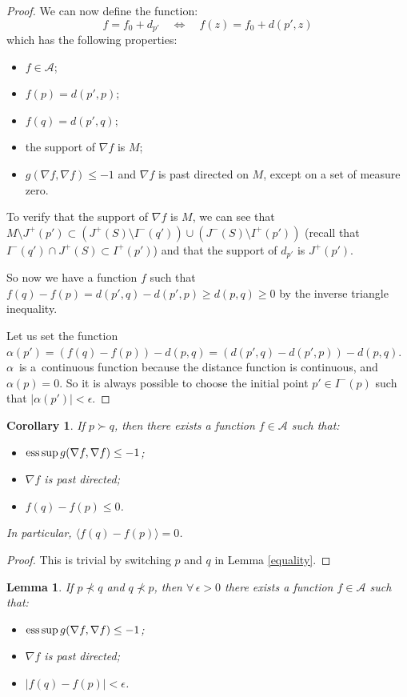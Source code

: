 \documentclass[11pt]{article}
\newtheorem{lemma}{Lemma}
\newtheorem{corollary}{Corollary}
\newcommand{\abs}[1]{\left\vert {#1} \right\vert}
\newcommand{\parenthese}[1]{\left( {#1} \right)}
\newcommand{\Lequi}{\Longleftrightarrow}
\begin{document}
\begin{proof}
We can now def\/ine the function:
\[
f = f_0 + d_{p'}  \quad \Lequi \quad f(z) = f_0 + d(p',z)
\]
which has the following properties:
\begin{itemize}\itemsep=0pt
\item $f\in\mathcal A$;
\item $f(p)= d(p',p)$;
\item $f(q)= d(p',q)$;
\item the support of $\nabla f$ is $M$;
\item $g( \nabla f, \nabla f) \leq -1$ and $\nabla f$ is past directed on $M$, except on a set of measure zero.
\end{itemize}

To verify that the support of $\nabla f$ is $M$, we can see that $M \setminus J^+(p') \subset \parenthese{J^+(S) \setminus I^-(q')} \cup  \parenthese{J^-(S) \setminus I^+(p')} $ (recall that $I^-(q') \cap J^+(S) \subset I^+(p')$) and that the support of $d_{p'}$ is $J^+(p')$.

So now we have a function $f$ such that $f(q)-f(p) = d(p',q) - d(p',p) \geq d(p,q) \geq 0$ by the inverse triangle inequality.

Let us set the function $\alpha(p') = \parenthese{f(q) - f(p)} - d(p,q) = \parenthese{d(p',q) - d(p',p)} - d(p,q)$. $\alpha$~is a~continuous function because the distance function is continuous, and $\alpha(p) = 0$. So it is always possible to choose the initial point $p' \in I^-(p)$ such that $\abs{\alpha(p')} < \epsilon$.
\end{proof}

\begin{corollary}\label{equalityrev}
If $p \succ q$, then there exists a function $f\in \mathcal A$ such that:
\begin{itemize}\itemsep=0pt
\item $\text{\rm ess} \sup g( \nabla f, \nabla f ) \leq -1$;
\item $\nabla f$ is past directed;
\item $f(q)-f(p) \leq 0$.
\end{itemize}
In particular, $\langle f(q)-f(p) \rangle = 0$.

\end{corollary}

\begin{proof}
This is trivial by switching $p$ and $q$ in Lemma \ref{equality}.
\end{proof}

\begin{lemma}\label{zero}
If $p \nprec q$ and $q \nprec p$, then $\forall \, \epsilon > 0$ there exists a function $f\in \mathcal A$ such that:
\begin{itemize}
\item $\text{\rm ess} \sup g( \nabla f, \nabla f ) \leq -1$;
\item $\nabla f$ is past directed;
\item $\abs{f(q)-f(p)} < \epsilon$.
\end{itemize}
\end{lemma}
\end{document}
